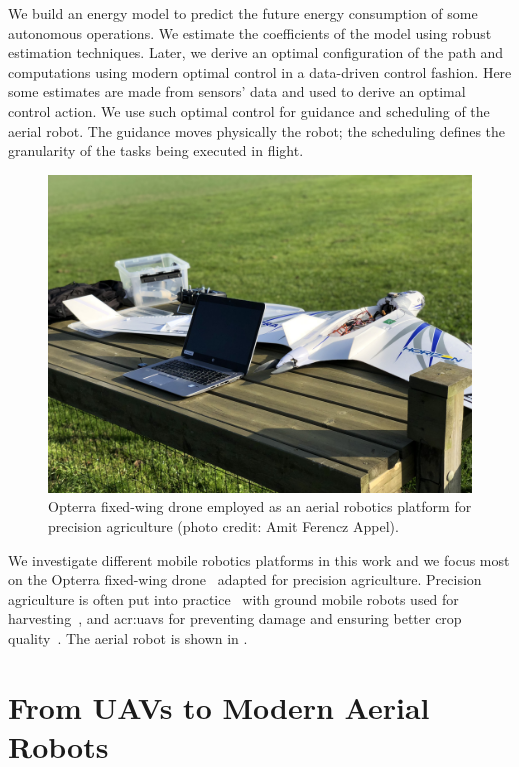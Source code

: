 We build an energy model to predict the future energy consumption of some autonomous operations. We estimate the coefficients of the model using robust estimation techniques. Later, we derive an optimal configuration of the path and computations using modern optimal control in a data-driven control fashion. Here some estimates are made from sensors' data and used to derive an optimal control action. We use such optimal control for guidance and scheduling of the aerial robot. The guidance moves physically the robot; the scheduling defines the granularity of the tasks being executed in flight.

\begin{figure}[t]
  \centering
  \includegraphics[width=.7\textwidth]{pictures/photo}
  \caption[Opterra fixed-wing drone]{Opterra fixed-wing drone employed as an aerial robotics platform for precision agriculture {\scriptsize(photo credit: Amit Ferencz Appel)}.}   
  \label{fig:opterra}
\end{figure}

We investigate different mobile robotics platforms in this work and we focus most on the Opterra fixed-wing drone~\citep{opterra} adapted for precision agriculture. Precision agriculture is often put into practice~\citep{hajjaj2014review} with ground mobile robots used for harvesting~\citep{qingchun2012study,dong2011development, de2011design, aljanobi2010setup, li2008analysis, edan2000robotic}, and \Gls{acr:uav}s for preventing damage and ensuring better crop quality~\citep{puri2017agriculture, daponte2019review}. The aerial robot is shown in .

\section{From UAVs to Modern Aerial Robots}

